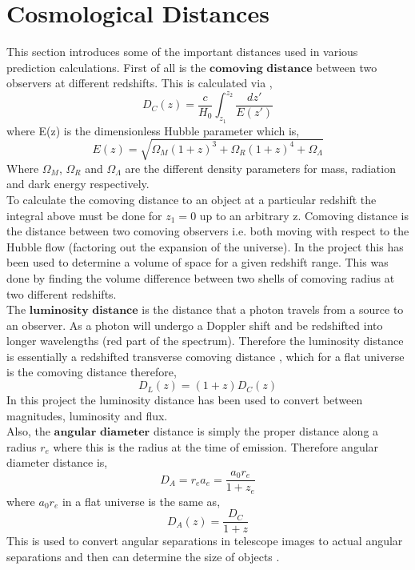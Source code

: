 \documentclass{article}
\begin{document}
\section{Cosmological Distances}
This section introduces some of the important distances used in various prediction calculations. First of all is the $\textbf{comoving distance}$ between two observers at different redshifts. This is calculated via \cite{distance_measures_cosmology},
\begin{equation}
D_{C}(z)=\frac{c}{H_{0}}\int^{z_{2}}_{z_{1}}\frac{dz'}{E(z')}
\end{equation}
where E(z) is the dimensionless Hubble parameter which is,
\begin{equation}
E(z)=\sqrt{\Omega_{M}(1+z)^{3}+\Omega_{R}(1+z)^{4}+\Omega_{\Lambda}}
\end{equation}
Where $\Omega_{M}$, $\Omega_{R}$ and $\Omega_{\Lambda}$ are the different density parameters for mass, radiation and dark energy respectively.\\
To calculate the comoving distance to an object at a particular redshift the integral above must be done for $z_{1}=0$ up to an arbitrary z. Comoving distance is the distance between two comoving observers i.e. both moving with respect to the Hubble flow (factoring out the expansion of the universe). In the project this has been used to determine a volume of space for a given redshift range. This was done by finding the volume difference between two shells of comoving radius at two different redshifts.\\

The $\textbf{luminosity distance}$ is the distance that a photon travels from a source to an observer. As a photon will undergo a Doppler shift and be redshifted into longer wavelengths (red part of the spectrum). Therefore the luminosity distance is essentially a redshifted transverse comoving distance \cite{distance_measures_cosmology}, which for a flat universe is the comoving distance therefore,
\begin{equation}
D_{L}(z)=(1+z)D_{C}(z)
\end{equation}
In this project the luminosity distance has been used to convert between magnitudes, luminosity and flux.\\

Also, the $\textbf{angular diameter}$ distance is simply the proper distance along a radius $r_{e}$ where this is the radius at the time of emission. Therefore angular diameter distance is,
\begin{equation}
D_{A}=r_{e}a_{e}=\frac{a_{0}r_{e}}{1+z_{e}}
\end{equation}
where $a_{0}r_{e}$ in a flat universe is the same as,
\begin{equation}
D_{A}(z)=\frac{D_{C}}{1+z}
\end{equation}
This is used to convert angular separations in telescope images to actual angular separations and then can determine the size of objects \cite{distance_measures_cosmology}.
\end{document}

